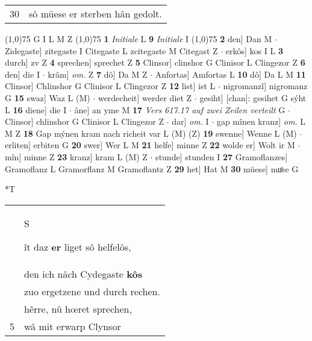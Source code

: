 \documentclass[8pt,a4paper,notitlepage]{article}
\begin{document}
\begin{table}[ht]
\begin{minipage}[t]{0.5\linewidth}
\begin{tabular}{rl}
30 & sô müese er sterben hân gedolt.\\ 
\end{tabular}
\scriptsize
\line(1,0){75} \newline
G I L M Z \newline
\line(1,0){75} \newline
\textbf{1} \textit{Initiale} L  \textbf{9} \textit{Initiale} I  \newline
\line(1,0){75} \newline
\textbf{2} den] Dan M  $\cdot$ Zidegaste] zitegaste I Citegaste L zcitegaste M Citegast Z  $\cdot$ erkôs] kos I L \textbf{3} durch] zv Z \textbf{4} sprechen] sprechet Z \textbf{5} Clinsor] clinshor G Clinisor L Clingezor Z \textbf{6} den] die I  $\cdot$ krâm] \textit{om.} Z \textbf{7} dô] Da M Z  $\cdot$ Anfortas] Amfortas L \textbf{10} dô] Da L M \textbf{11} Clinsor] Chlinshor G Clinisor L Clingezor Z \textbf{12} list] ist L  $\cdot$ nigromanzî] nigromanz G \textbf{15} swaz] Waz L (M)  $\cdot$ werdecheit] werder diet Z  $\cdot$ gesiht] [chan]: gesihet G sýht L \textbf{16} diene] die I  $\cdot$ âne] an yme M \textbf{17} \textit{Vers 617.17 auf zwei Zeilen verteilt} G   $\cdot$ Clinsor] chlinshor G Clinisor L Clingezor Z  $\cdot$ dar] \textit{om.} I  $\cdot$ gap mînen kranz] \textit{om.} L M Z \textbf{18} Gap mýnen kram nach richeit var L (M) (Z) \textbf{19} swenne] Wenne L (M)  $\cdot$ erliten] erbiten G \textbf{20} swer] Wer L M \textbf{21} helfe] minne Z \textbf{22} wolde er] Wolt ir M  $\cdot$ mîn] minne Z \textbf{23} kranz] kram L (M) Z  $\cdot$ stunde] stunden I \textbf{27} Gramoflanzes] Gramoflanz L Gramorflanz M Gramoflantz Z \textbf{29} het] Hat M \textbf{30} müese] muͦse G \newline
\end{minipage}
\hspace{0.5cm}
\begin{minipage}[t]{0.5\linewidth}
\small
\begin{center}*T
\end{center}
\begin{tabular}{rl}
 & \begin{large}S\end{large}ît daz \textbf{er} liget sô helfelôs,\\ 
 & den ich nâch Cydegaste \textbf{kôs}\\ 
 & zuo ergetzene und durch rechen.\\ 
 & hêrre, nû hœret sprechen,\\ 
5 & wâ mit erwarp Clynsor\\ 

\end{tabular}
\end{minipage}
\end{table}
\end{document}

